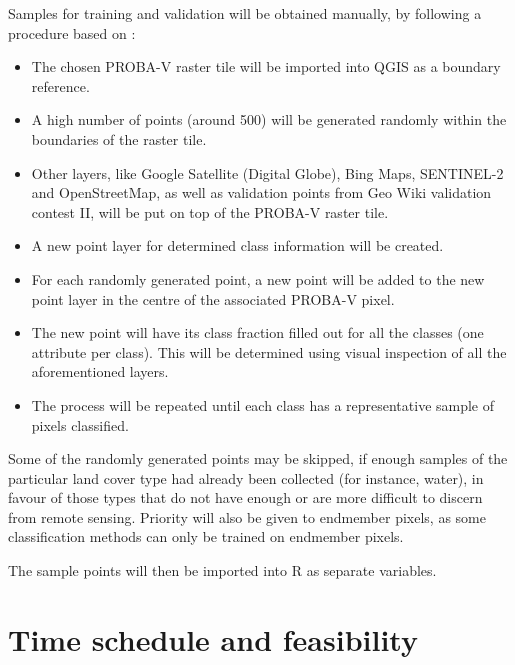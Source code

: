 \documentclass[a4paper,10pt]{article}
\begin{document}
Samples for training and validation will be obtained manually, by following a procedure based on \cite{defries1998training}:
\begin{itemize}
 \item The chosen PROBA-V raster tile will be imported into QGIS as a boundary reference.
 \item A high number of points (around 500) will be generated randomly within the boundaries of the raster tile.
 \item Other layers, like Google Satellite (Digital Globe), Bing Maps, SENTINEL-2 and OpenStreetMap, as well as validation points from Geo Wiki validation contest II, will be put on top of the PROBA-V raster tile.
 \item A new point layer for determined class information will be created.
 \item For each randomly generated point, a new point will be added to the new point layer in the centre of the associated PROBA-V pixel.
 \item The new point will have its class fraction filled out for all the classes (one attribute per class). This will be determined using visual inspection of all the aforementioned layers.
 \item The process will be repeated until each class has a representative sample of pixels classified.
\end{itemize}

Some of the randomly generated points may be skipped, if enough samples of the particular land cover type had already been collected (for instance, water), in favour of those types that do not have enough or are more difficult to discern from remote sensing. Priority will also be given to endmember pixels, as some classification methods can only be trained on endmember pixels.

The sample points will then be imported into R as separate variables.

\section{Time schedule and feasibility}


\end{document}
